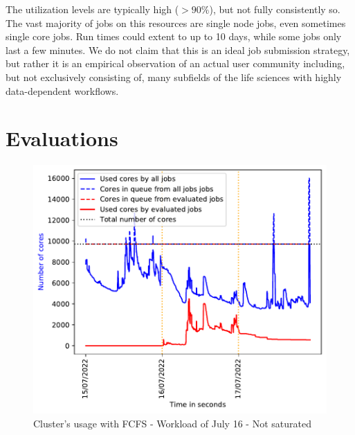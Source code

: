 \documentclass[conference,10pt]{IEEEtran}
\begin{document}
The utilization levels are typically high ($>90\%$), but
not fully consistently so. The vast majority of jobs on this resources are single node jobs, even sometimes single core jobs. Run times
could extent to up to 10 days, while some jobs only last a few minutes. We do not claim that this is an ideal job submission strategy,
but rather it is an empirical observation of an actual user community including, but not exclusively consisting of, many subfields of the life sciences with highly data-dependent workflows.

\section{Evaluations}\label{sec.evaluations}

\begin{figure}[H]\centering\includegraphics[width=1\linewidth]{../MBSS/plot/2022-07-16->2022-07-16_V10000_Fcfs_Used_nodes_Reduced_450_128_32_256_4_1024.pdf}\caption{Cluster's usage with FCFS - Workload of July 16 - Not saturated}\end{figure}
\end{document}
